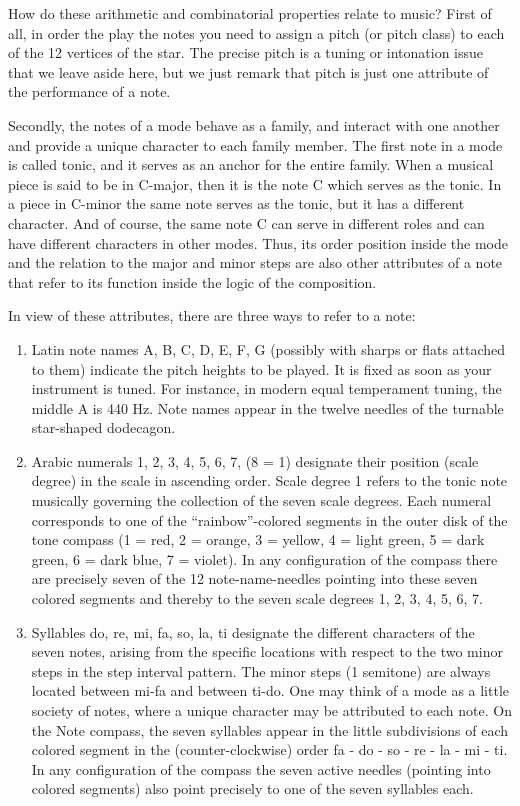 How do these arithmetic and combinatorial properties relate to music? First of all, in order the play the notes you need to assign a pitch (or pitch class) to each of the 12 vertices of the star. The precise pitch is a tuning or intonation issue that we leave aside here, but we just remark that pitch is just one attribute of the performance of a note.


Secondly, the notes of a mode behave as a family, and interact with one another and provide a unique character to each family member. The first note in a mode is called tonic, and it serves as an anchor for the entire family. When a musical piece is said to be in C-major, then it is the note C which serves as the tonic. In a piece in C-minor the same note serves as the tonic, but it has a different character. And of course, the same note C can serve in different roles and can have different characters in other modes. Thus, its order position inside the mode and the relation to the major and minor steps are also other attributes of a note that refer to its function inside the logic of the composition.

In view of these attributes, there are three ways to refer to a note:

\begin{enumerate}

\item Latin note names A, B, C, D, E, F, G (possibly with sharps or flats attached to them) indicate the pitch heights to be played. It is fixed as soon as your instrument is tuned. For instance, in modern equal temperament tuning, the middle A is 440 Hz. Note names appear in the twelve needles of the turnable star-shaped dodecagon.

\item Arabic numerals 1, 2, 3, 4, 5, 6, 7, (8 = 1) designate their position (scale degree) in the scale in ascending order. Scale degree 1 refers to the tonic note musically governing the collection of the seven scale degrees. Each numeral corresponds to one of the ``rainbow''-colored segments in the outer disk of the tone compass (1 = red, 2 = orange, 3 = yellow, 4 = light green, 5 = dark green, 6 = dark blue, 7 = violet). In any configuration of the compass there are precisely seven of the 12 note-name-needles pointing into these seven colored segments and thereby to the seven scale degrees 1, 2, 3, 4, 5, 6, 7.

\item Syllables do, re, mi, fa, so, la, ti designate the different characters of the seven notes, arising from the specific locations with respect to the two minor steps in the step interval pattern. The minor steps (1 semitone) are always located between mi-fa and between ti-do. One may think of a mode as a little society of notes, where a unique character may be attributed to each note. On the Note compass, the seven syllables appear in the little subdivisions of each colored segment in the (counter-clockwise) order fa - do - so - re - la - mi - ti. In any configuration of the compass the seven active needles (pointing into colored segments) also point precisely to one of the seven syllables each.

\end{enumerate}

